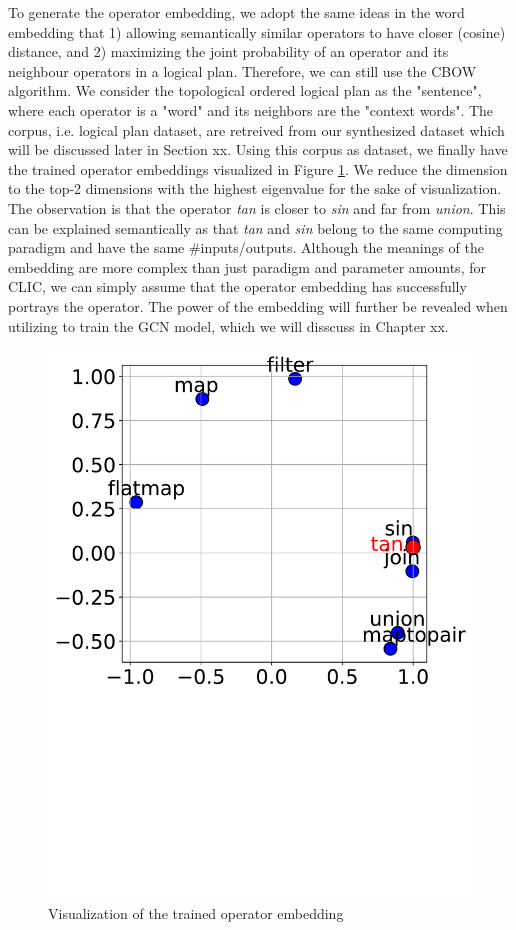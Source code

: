 To generate the operator embedding, we adopt the same ideas in the word embedding that
1) allowing semantically similar operators to have closer (cosine) distance, 
and 2) maximizing the joint probability of an operator and its neighbour operators in a logical plan.
Therefore, we can still use the CBOW algorithm.
We consider the topological ordered logical plan as the "sentence", where each operator is a "word" and its neighbors are the "context words". 
The corpus, i.e. logical plan dataset, are retreived from our synthesized dataset which will be discussed later in Section xx.
Using this corpus as dataset, we finally have the trained operator embeddings visualized in Figure \ref{fig:emb_visual}.
We reduce the dimension to the top-2 dimensions with the highest eigenvalue for the sake of visualization.
The observation is that the operator \textit{tan} is closer to \textit{sin} and far from \textit{union}.
This can be explained semantically as that \textit{tan} and \textit{sin} belong to the same computing paradigm and have the same \#inputs/outputs.
Although the meanings of the embedding are more complex than just paradigm and parameter amounts, 
for CLIC, 
we can simply assume that the operator embedding has successfully portrays the operator.
The power of the embedding will further be revealed when utilizing to train the GCN model, which we will disscuss in Chapter xx.

\begin{figure}[tbh]
  \centering
  \includegraphics[width=0.8\linewidth]{figures/embedding_visual.pdf}
  \caption{Visualization of the trained operator embedding}
  \label{fig:emb_visual}
\end{figure}

